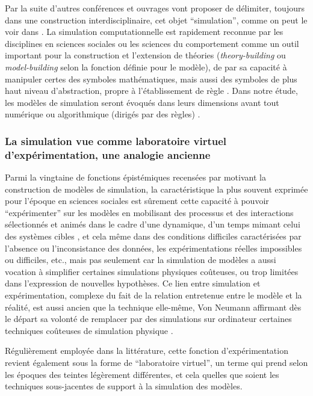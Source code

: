 Par la suite d'autres conférences et ouvrages vont proposer de délimiter, toujours dans une construction interdisciplinaire, cet objet \enquote{simulation}, comme on peut le voir dans \autocites{Guetzkow1962, Borko1962, Guetzkow1972, Dutton1971}. La simulation computationnelle est rapidement reconnue par les disciplines en sciences sociales ou les sciences du comportement comme un outil important pour la construction et l'extension de théories (\textit{theory-building} ou \textit{model-building} selon la fonction définie pour le modèle), de par sa capacité à manipuler certes des symboles mathématiques, mais aussi des symboles de plus haut niveau d'abstraction, propre à l'établissement de règle \autocite[924-925]{Clarkson1960}. Dans notre étude, les modèles de simulation seront évoqués dans leurs dimensions avant tout numérique ou algorithmique (dirigés par des règles) \autocite[36-38]{Varenne2013b}.

\subsubsection{La simulation vue comme laboratoire virtuel d'expérimentation, une analogie ancienne}
\label{ssec:labo_virtuelle}

Parmi la vingtaine de fonctions épistémiques recensées par \textcite[14-23]{Varenne2013b} motivant la construction de modèles de simulation, la caractéristique la plus souvent exprimée pour l'époque en sciences sociales est sûrement cette capacité à pouvoir \enquote{expérimenter} sur les modèles en mobilisant des processus et des interactions sélectionnés et animés dans le cadre d'une dynamique, d'un temps mimant celui des systèmes cibles , et cela même dans des conditions difficiles caractérisées par l'absence ou l'inconsistance des données, les expérimentations réelles impossibles ou difficiles, etc., mais pas seulement car la simulation de modèles a aussi vocation à simplifier certaines simulations physiques coûteuses, ou trop limitées dans l'expression de nouvelles hypothèses. Ce lien entre simulation et expérimentation, complexe du fait de la relation entretenue entre le modèle et la réalité, est aussi ancien que la technique elle-même, Von Neumann affirmant dès le départ sa volonté de remplacer par des simulations sur ordinateur certaines techniques coûteuses de simulation physique \autocite[15]{Winsberg2013}.

Régulièrement employée dans la littérature, cette fonction d’expérimentation  revient également sous la forme de \enquote{laboratoire virtuel}, un terme qui prend selon les époques des teintes légèrement différentes, et cela quelles que soient les techniques sous-jacentes de support à la simulation des modèles.

